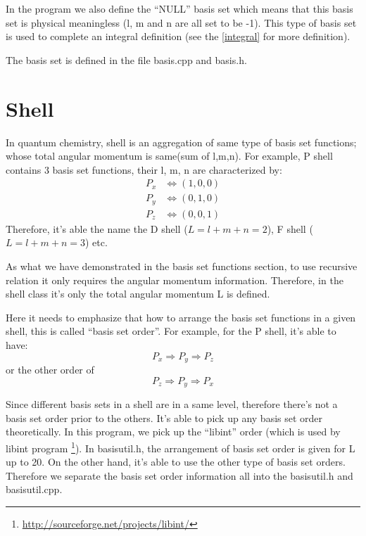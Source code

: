 In the program we also define the ``NULL'' basis set which means that 
this basis set is physical meaningless (l, m and n are all set to be -1). 
This type of basis set is used to complete an integral definition (see the \ref{integral} 
for more definition).

The basis set is defined in the file basis.cpp and basis.h.

\section{Shell}
%
%
%
\label{shell}

In quantum chemistry, shell is an aggregation of same type of basis set
functions; whose total angular momentum is same(sum of l,m,n). For example, 
P shell contains 3 basis set functions, their l, m, n are characterized by:
\begin{align}\label{pshell_example}
	P_{x} &\Leftrightarrow (1,0,0) \nonumber \\
	P_{y} &\Leftrightarrow (0,1,0) \nonumber \\
	P_{z} &\Leftrightarrow (0,0,1)
\end{align}
Therefore, it's able the name the D shell ($L = l+m+n = 2$), 
F shell ($L = l+m+n = 3$) etc.

As what we have demonstrated in the basis set functions section, to use
recursive relation it only requires the angular momentum information. 
Therefore, in the shell class it's only the total angular momentum L
is defined.

Here it needs to emphasize that how to arrange the basis set
functions in a given shell, this is called ``basis set order''.
For example, for the P shell, it's able to have:
\begin{equation}
 P_{x} \Rightarrow P_{y} \Rightarrow P_{z}
\end{equation} 
or the other order of 
\begin{equation}
 P_{z} \Rightarrow P_{y} \Rightarrow P_{x}
\end{equation} 

Since different basis sets in a shell are in a same level, therefore
there's not a basis set order prior to the others. It's able to 
pick up any basis set order theoretically. In this program, we 
pick up the ``libint'' order (which is used by libint program
\footnote{\url{http://sourceforge.net/projects/libint/}}). 
In basisutil.h, the arrangement of basis set order is given for 
L up to 20. On the other hand, it's able to use the other 
type of basis set orders. Therefore we separate the basis set 
order information all into the basisutil.h and basisutil.cpp.

